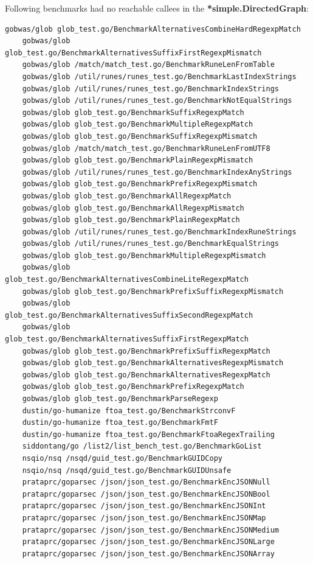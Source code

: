 \documentclass{seal_thesis}
\begin{document}
\label{sameincsv1asincsv2}
Following benchmarks had no reachable callees in the \textbf{*simple.DirectedGraph}:
\begin{lstlisting}[basicstyle=\tiny]
	gobwas/glob glob_test.go/BenchmarkAlternativesCombineHardRegexpMatch
	gobwas/glob glob_test.go/BenchmarkAlternativesSuffixFirstRegexpMismatch
	gobwas/glob /match/match_test.go/BenchmarkRuneLenFromTable
	gobwas/glob /util/runes/runes_test.go/BenchmarkLastIndexStrings
	gobwas/glob /util/runes/runes_test.go/BenchmarkIndexStrings
	gobwas/glob /util/runes/runes_test.go/BenchmarkNotEqualStrings
	gobwas/glob glob_test.go/BenchmarkSuffixRegexpMatch
	gobwas/glob glob_test.go/BenchmarkMultipleRegexpMatch
	gobwas/glob glob_test.go/BenchmarkSuffixRegexpMismatch
	gobwas/glob /match/match_test.go/BenchmarkRuneLenFromUTF8
	gobwas/glob glob_test.go/BenchmarkPlainRegexpMismatch
	gobwas/glob /util/runes/runes_test.go/BenchmarkIndexAnyStrings
	gobwas/glob glob_test.go/BenchmarkPrefixRegexpMismatch
	gobwas/glob glob_test.go/BenchmarkAllRegexpMatch
	gobwas/glob glob_test.go/BenchmarkAllRegexpMismatch
	gobwas/glob glob_test.go/BenchmarkPlainRegexpMatch
	gobwas/glob /util/runes/runes_test.go/BenchmarkIndexRuneStrings
	gobwas/glob /util/runes/runes_test.go/BenchmarkEqualStrings
	gobwas/glob glob_test.go/BenchmarkMultipleRegexpMismatch
	gobwas/glob glob_test.go/BenchmarkAlternativesCombineLiteRegexpMatch
	gobwas/glob glob_test.go/BenchmarkPrefixSuffixRegexpMismatch
	gobwas/glob glob_test.go/BenchmarkAlternativesSuffixSecondRegexpMatch
	gobwas/glob glob_test.go/BenchmarkAlternativesSuffixFirstRegexpMatch
	gobwas/glob glob_test.go/BenchmarkPrefixSuffixRegexpMatch
	gobwas/glob glob_test.go/BenchmarkAlternativesRegexpMismatch
	gobwas/glob glob_test.go/BenchmarkAlternativesRegexpMatch
	gobwas/glob glob_test.go/BenchmarkPrefixRegexpMatch
	gobwas/glob glob_test.go/BenchmarkParseRegexp
	dustin/go-humanize ftoa_test.go/BenchmarkStrconvF
	dustin/go-humanize ftoa_test.go/BenchmarkFmtF
	dustin/go-humanize ftoa_test.go/BenchmarkFtoaRegexTrailing
	siddontang/go /list2/list_bench_test.go/BenchmarkGoList
	nsqio/nsq /nsqd/guid_test.go/BenchmarkGUIDCopy
	nsqio/nsq /nsqd/guid_test.go/BenchmarkGUIDUnsafe
	prataprc/goparsec /json/json_test.go/BenchmarkEncJSONNull
	prataprc/goparsec /json/json_test.go/BenchmarkEncJSONBool
	prataprc/goparsec /json/json_test.go/BenchmarkEncJSONInt
	prataprc/goparsec /json/json_test.go/BenchmarkEncJSONMap
	prataprc/goparsec /json/json_test.go/BenchmarkEncJSONMedium
	prataprc/goparsec /json/json_test.go/BenchmarkEncJSONLarge
	prataprc/goparsec /json/json_test.go/BenchmarkEncJSONArray

\end{lstlisting}
\end{document}

